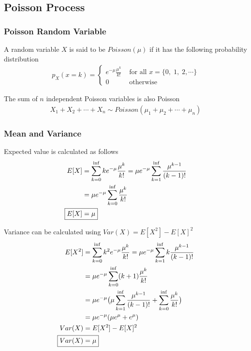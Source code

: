 \documentclass[../../probability-notes.tex]{subfiles}
\begin{document}
    \subsection{Poisson Process}
    \subsubsection{Poisson Random Variable}
    A random variable $X$ is said to be $Poisson(\mu)$ if it has the following probability distribution
    \begin{align*}
        p_{X}(x = k) = \begin{cases} e^{-\mu} \frac{\mu^{k}}{k!} &\text{ for all } x = \{ 0,\;1,\;2, \cdots \}\\
                                    0 &\text{ otherwise} \end{cases}
    \end{align*}

    The sum of $n$ independent Poisson variables is also Poisson
    \begin{align*}
        X_{1} + X_{2} + \cdots + X_{n} \sim Poisson(\mu_{1} + \mu_{2} + \cdots + \mu_{n})
    \end{align*}

    \subsubsection{Mean and Variance}
    Expected value is calculated as follows
    \begin{align*}
        E[X] &= \sum_{k=0}^{\inf} ke^{-\mu} \frac{\mu^{k}}{k!} = \mu e^{-\mu} \sum_{k=1}^{\inf} \frac{\mu^{k-1}}{(k-1)!}\\
        &= \mu e^{-\mu} \sum_{k=0}^{\inf} \frac{\mu^{k}}{k!}\\
        \Aboxed{E[X] &= \mu}
    \end{align*}

    Variance can be calculated using $Var(X) = E[X^{2}] - E[X]^{2}$
    \begin{align*}
        E[X^{2}] &= \sum_{k=0}^{\inf} k^{2} e^{-\mu} \frac{\mu^{k}}{k!} = \mu e^{-\mu} \sum_{k=1}^{\inf} k\frac{\mu^{k-1}}{(k-1)!}\\
        &= \mu e^{-\mu} \sum_{k=0}^{\inf} (k+1) \frac{\mu^{k}}{k!}\\
        &= \mu e^{-\mu} \big( \mu \sum_{k=1}^{\inf} \frac{\mu^{k-1}}{(k-1)!} + \sum_{k=0}^{\inf} \frac{\mu^{k}}{k!} \big)\\
        &= \mu e^{-\mu} (\mu e^{\mu} + e^{\mu})\\
        Var(X) &= E[X^{2}] - E[X]^{2}\\
        \Aboxed{Var(X) &= \mu}
    \end{align*}
\end{document}

